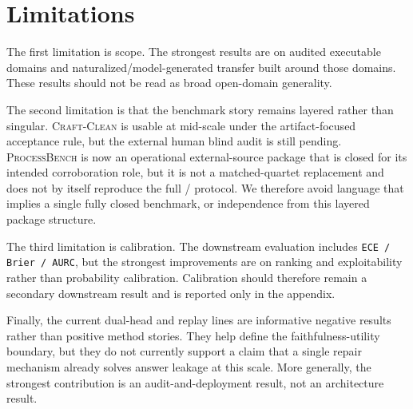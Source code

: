 \section{Limitations}

The first limitation is scope. The strongest results are on audited executable
domains and naturalized/model-generated transfer built around those domains.
These results should not be read as broad open-domain generality.

The second limitation is that the benchmark story remains layered rather than
singular. \textsc{Craft-Clean} is usable at mid-scale under the
artifact-focused acceptance rule, but the external human blind audit is still
pending. \textsc{ProcessBench} is now an operational external-source package
that is closed for its intended corroboration role, but it is not a
matched-quartet replacement and does not by itself reproduce the full
\amcd/\ass{} protocol. We therefore avoid language that implies a single fully
closed benchmark, or independence from this layered package structure.

The third limitation is calibration. The downstream evaluation includes
\texttt{ECE / Brier / AURC}, but the strongest improvements are on ranking and
exploitability rather than probability calibration. Calibration should
therefore remain a secondary downstream result and is reported only in the
appendix.

Finally, the current dual-head and replay lines are informative negative
results rather than positive method stories. They help define the
faithfulness-utility boundary, but they do not currently support a claim that a
single repair mechanism already solves answer leakage at this scale. More
generally, the strongest contribution is an audit-and-deployment result, not an
architecture result.
